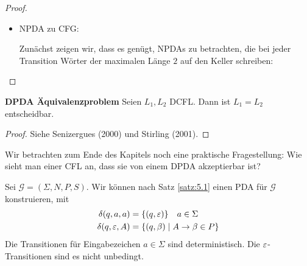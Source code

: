{\begin{proof}
\begin{itemize}
  \item \ac{NPDA} zu \ac{CFG}:

    Zunächst zeigen wir, dass es genügt, \ac{NPDA}s zu betrachten, die bei jeder Transition Wörter der maximalen Länge $2$ auf den Keller schreiben:



\end{itemize}
  
\end{proof}



\begin{Satz} \textbf{DPDA Äquivalenzproblem}
    Seien $L_1, L_2$ DCFL. Dann ist $L_1 = L_2$ entscheidbar.
\end{Satz}

\begin{proof}
    Siehe Senizergues (2000) und Stirling (2001).
\end{proof}

Wir betrachten zum Ende des Kapitels noch eine praktische Fragestellung: Wie sieht man einer CFL an, dass sie von einem DPDA akzeptierbar ist?

Sei $\mathcal{G} = (\Sigma, N, P, S)$.
Wir können nach Satz \ref{satz:5.1} einen \ac{PDA} für $\mathcal{G}$ konstruieren, mit
\begin{align*}
  \delta(q, a, a) &= \{(q, \varepsilon)\} \quad a \in \Sigma \\
  \delta(q, \varepsilon, A) &= \{(q, \beta)  \mid A \to \beta \in P\}
\end{align*}
Die Transitionen für Eingabezeichen $a \in \Sigma$ sind deterministisch.
Die $\varepsilon$-Transitionen sind es nicht unbedingt.

}
